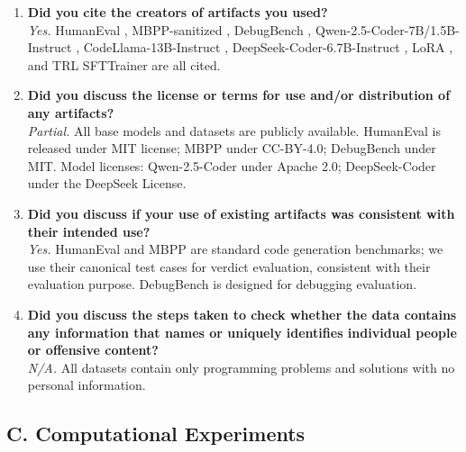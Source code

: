 \documentclass[11pt,a4paper]{article}
\begin{document}
\begin{enumerate}
\item \textbf{Did you cite the creators of artifacts you used?} \\
\textit{Yes.} HumanEval \cite{chen2021evaluating}, MBPP-sanitized \cite{austin2021program}, DebugBench \cite{tian2024debugbench}, Qwen-2.5-Coder-7B/1.5B-Instruct \cite{qwen2024coder}, CodeLlama-13B-Instruct \cite{roziere2024code}, DeepSeek-Coder-6.7B-Instruct \cite{deepseek2024coder}, LoRA \cite{hu2022lora}, and TRL SFTTrainer are all cited.

\item \textbf{Did you discuss the license or terms for use and/or distribution of any artifacts?} \\
\textit{Partial.} All base models and datasets are publicly available. HumanEval is released under MIT license; MBPP under CC-BY-4.0; DebugBench under MIT. Model licenses: Qwen-2.5-Coder under Apache 2.0; DeepSeek-Coder under the DeepSeek License.

\item \textbf{Did you discuss if your use of existing artifacts was consistent with their intended use?} \\
\textit{Yes.} HumanEval and MBPP are standard code generation benchmarks; we use their canonical test cases for verdict evaluation, consistent with their evaluation purpose. DebugBench is designed for debugging evaluation.

\item \textbf{Did you discuss the steps taken to check whether the data contains any information that names or uniquely identifies individual people or offensive content?} \\
\textit{N/A.} All datasets contain only programming problems and solutions with no personal information.
\end{enumerate}

\subsection*{C. Computational Experiments}
\end{document}
